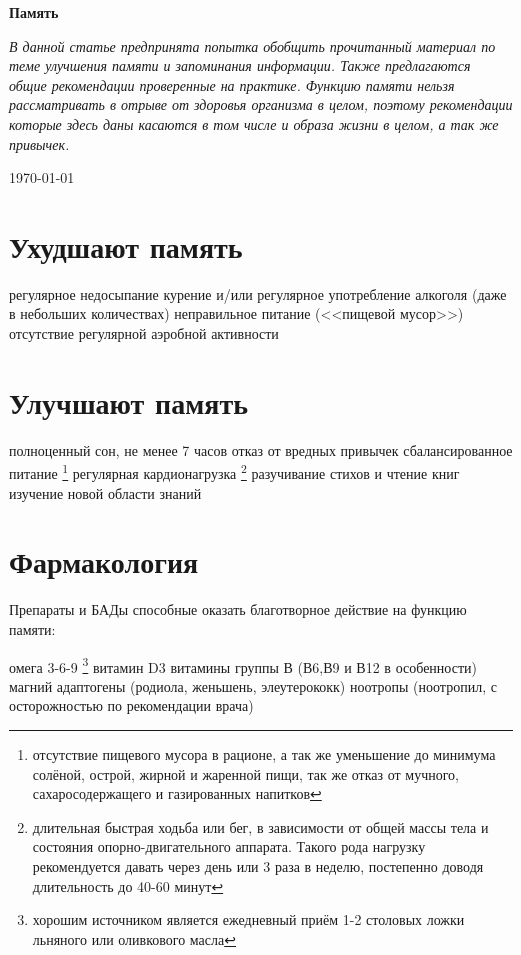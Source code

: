 \documentclass[12pt]{article}			%
\begin{document}
\begin{center}
	\Huge{\textbf{Память}}
\end{center}

\hfill

\noindent
\textit{В данной статье предпринята попытка обобщить прочитанный материал по теме улучшения памяти и запоминания информации. Также предлагаются общие рекомендации проверенные на практике. Функцию памяти нельзя рассматривать в отрыве от здоровья организма в целом, поэтому рекомендации которые здесь даны касаются в том числе и образа жизни в целом, а так же привычек.}

\begin{flushright}
	\today
\end{flushright}
\hfill
	
\section{Ухудшают память}
\begin{outline}[itemize]
	\1 регулярное недосыпание
	\1 курение и/или регулярное употребление алкоголя (даже в небольших количествах)
	\1 неправильное питание (<<пищевой мусор>>)
	\1 отсутствие регулярной аэробной активности
\end{outline}

\section{Улучшают память}
\begin{outline}[itemize]
	\1 полноценный сон, не менее 7 часов
	\1 отказ от вредных привычек
	\1 сбалансированное питание \footnote{отсутствие пищевого мусора в рационе, а так же уменьшение до минимума солёной, острой, жирной и жаренной пищи, так же отказ от мучного, сахаросодержащего и газированных напитков}
	\1 регулярная кардионагрузка \footnote{длительная быстрая ходьба или бег, в зависимости от общей массы тела и состояния опорно-двигательного аппарата. Такого рода нагрузку рекомендуется давать через день или 3 раза в неделю, постепенно доводя длительность до 40-60 минут}
	\1 разучивание стихов и чтение книг
	\1 изучение новой области знаний
\end{outline}

\section{Фармакология}
Препараты и БАДы способные оказать благотворное действие на функцию памяти:
\begin{outline}[itemize]
	\1 омега 3-6-9 \footnote{хорошим источником является ежедневный приём 1-2 столовых ложки льняного или оливкового масла}
	\1 витамин D3
	\1 витамины группы В (В6,В9 и В12 в особенности)
	\1 магний
	\1 адаптогены (родиола, женьшень, элеутерококк)
	\1 ноотропы (ноотропил, с осторожностью по рекомендации врача)
\end{outline}
	
\end{document}
